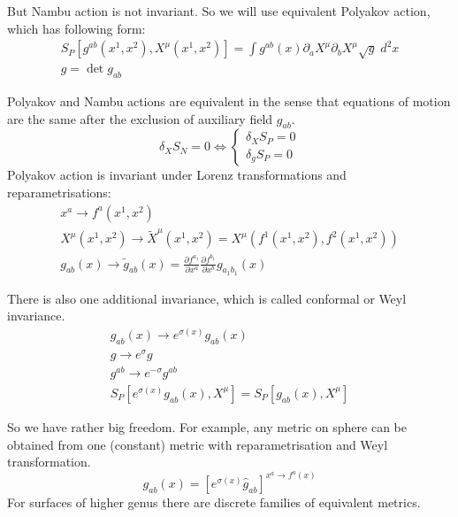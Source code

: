 \documentclass[a4paper,12pt]{article}
\theoremstyle{definition} \newtheorem{Def}{Definition}
\begin{document}
But Nambu action is not invariant. So we will use equivalent Polyakov action, which has following form:
\begin{equation}
  \label{eq:5}
  \begin{split}
    S_P [g^{ab}(x^1,x^2), X^{\mu}(x^1,x^2)]=\int g^{ab}(x)\partial_a X^{\mu} \partial_b X^{\mu}\sqrt{g} \;d^2 x\\
    g=\det g_{ab}
  \end{split}
\end{equation}

Polyakov and Nambu actions are equivalent in the sense that equations of motion are the same after the exclusion of auxiliary field $g_{ab}$.
\begin{equation}
  \label{eq:6}
  \delta_{X}S_N=0 \Longleftrightarrow \left\{
      \begin{aligned}
        \delta_X S_P=0\\
        \delta_g S_P=0
      \end{aligned}
      \right.
\end{equation}
Polyakov action is invariant under Lorenz transformations and reparametrisations:
\begin{equation}
  \label{eq:7}
  \begin{split}
    x^a \to f^a (x^1,x^2)\\
    X^{\mu}(x^1,x^2)\to \tilde{X}^{\mu}(x^1,x^2)=X^{\mu}(f^1(x^1,x^2),f^2(x^1,x^2))\\
    g_{ab}(x)\to \tilde{g}_{ab}(x)=\frac{\partial f^{a_1}}{\partial x^{a}}\frac{\partial f^{b_1}}{\partial x^b} g_{a_1 b_1}(x)
  \end{split}  
\end{equation}

There is also one additional invariance, which is called conformal or Weyl invariance.
\begin{equation}
  \label{eq:8}
  \begin{split}
    g_{ab}(x)\to e^{\sigma(x)}g_{ab}(x)\\
    g\to e^{\sigma} g\\
    g^{ab}\to e^{-\sigma} g^{ab}\\
    S_P[e^{\sigma(x)} g_{ab}(x),X^{\mu}] = S_P[g_{ab}(x),X^{\mu}] 
  \end{split}
\end{equation}

So we have rather big freedom. For example, any metric on sphere can be obtained from one (constant) metric with reparametrisation and Weyl transformation.
\begin{equation}
  \label{eq:9}
  g_{ab}(x)=[e^{\sigma(x)}\hat{g}_{ab}]^{x^a\to f^a (x)}
\end{equation}
For surfaces of higher genus there are discrete families of equivalent metrics.
\end{document}
